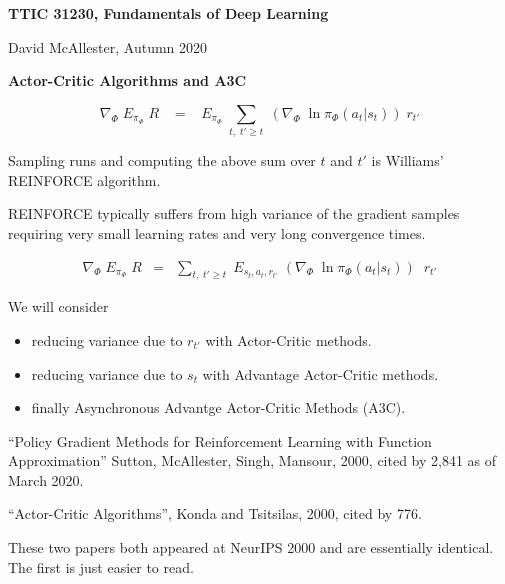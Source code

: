




{\Huge

  \centerline{\bf TTIC 31230, Fundamentals of Deep Learning}
  \bigskip
  \centerline{David McAllester, Autumn 2020}
  \vfill
  \centerline{\bf Actor-Critic Algorithms and A3C}
  \vfill
  \vfill  

$$\nabla_\Phi \;E_{\pi_\Phi}\;R \;\;\; = \;\;\; E_{\pi_\Phi}\; \sum_{t,\;t' \geq t} \; \left(\nabla_\Phi\;\ln \pi_\Phi(a_t|s_t)\right) \;r_{t'}$$

\vfill
Sampling runs and computing the above sum over $t$ and $t'$ is Williams' REINFORCE algorithm.


REINFORCE typically suffers from high variance of the gradient samples requiring very small learning rates and very long convergence times.

\begin{eqnarray*}
    \nabla_\Phi \; E_{\pi_\Phi}\; R  & = & \sum_{t,\;t'\geq t}\; E_{s_t,a_t,r_{t'}}\; \left(\nabla_\Phi\;\ln \pi_\Phi(a_{t}|s_{t})\right)\;\;r_{t'}
\end{eqnarray*}

\vfill
We will consider
\begin{itemize}
\item reducing variance due to $r_{t'}$ with Actor-Critic methods.
\item reducing variance due to  $s_t$ with Advantage Actor-Critic methods.
\item finally Asynchronous Advantge Actor-Critic Methods (A3C).
\end{itemize}


``Policy Gradient Methods for
Reinforcement Learning with Function
Approximation'' Sutton, McAllester, Singh, Mansour, 2000, cited by 2,841 as of March 2020.

\vfill
``Actor-Critic Algorithms'', Konda and Tsitsilas, 2000, cited by 776.

\vfill
These two papers both appeared at NeurIPS 2000 and are essentially identical.  The first is just easier to read.



}
